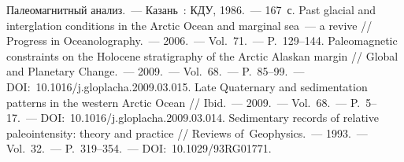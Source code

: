 \begin{thebibliography}{99}
\bibitem{} Палеомагнитный анализ.~--- Казань~: КДУ, 1986.~--- 167~с.
\bibitem{} Past glacial and interglation conditions in the Arctic Ocean and marginal sea~--- a revive // Progress in Oceanolography.~--- 2006.~--- Vol.~71.~--- P.~129--144.
\bibitem{} Paleomagnetic constraints on the Holocene stratigraphy of the Arctic Alaskan margin // Global and Planetary Change.~--- 2009.~--- Vol.~68.~--- P.~85--99.~--- DOI:~10.1016/j.gloplacha.2009.03.015.
\bibitem{} Late Quaternary and sedimentation patterns in the western Arctic Ocean // Ibid.~--- 2009.~--- Vol.~68.~--- P.~5--17.~--- DOI:~10.1016/j.gloplacha.2009.03.014.
\bibitem{} Sedimentary records of relative paleointensity: theory and practice // Reviews of~Geophysics.~--- 1993.~--- Vol.~32.~--- P.~319--354.~--- DOI:~10.1029/93RG01771.

\end{thebibliography}
\thispagestyle{empty}
